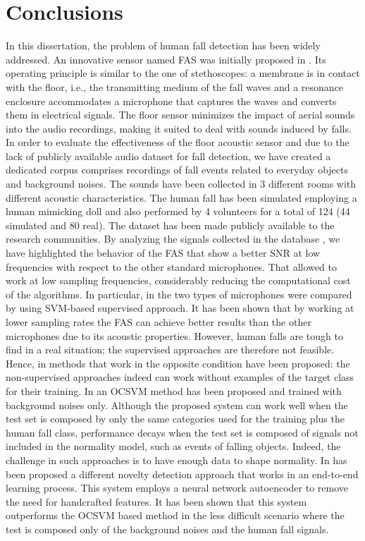  
\chapter{Conclusions}

In this dissertation, the problem of human fall detection has been widely addressed. An innovative sensor named FAS was initially proposed in . Its operating principle is similar to the one of stethoscopes: a membrane is in contact with the floor, i.e., the transmitting medium of the fall waves and a resonance enclosure accommodates a microphone that captures the waves and converts them in electrical signals. The floor sensor minimizes the impact of aerial sounds into the audio recordings, making it suited to deal with sounds induced by falls. In order to evaluate the effectiveness of the floor acoustic sensor and due to the lack of publicly available audio dataset for fall detection, we have created a dedicated corpus comprises recordings of fall events related to everyday objects and background noises. The sounds have been collected in 3 different rooms with different acoustic characteristics. The human fall has been simulated employing a human mimicking doll and also performed by 4 volunteers for a total of 124 (44 simulated and 80 real). The dataset has been made publicly available to the research communities. By analyzing the signals collected in the database , we have highlighted the behavior of the FAS that show a better SNR at low frequencies with respect to the other standard microphones. That allowed to work at low sampling frequencies, considerably reducing the computational cost of the algorithms. In particular, in  the two types of microphones were compared by using SVM-based supervised approach. It has been shown that by working at lower sampling rates the FAS can achieve better results than the other microphones due to its acoustic properties. However, human falls are tough to find in a real situation; the supervised approaches are therefore not feasible. Hence, in  methods that work in the opposite condition have been proposed: the non-supervised approaches indeed can work without examples of the target class for their training. In  an OCSVM method has been proposed and trained with background noises only. Although the proposed system can work well when the test set is composed by only the same categories used for the training plus the human fall class, performance decays when the test set is composed of signals not included in the normality model, such as events of falling objects. Indeed, the challenge in such approaches is to have enough data to shape normality. In  has been proposed a different novelty detection approach that works in an end-to-end learning process. This system employs a neural network autoencoder to remove the need for handcrafted features. It has been shown that this system outperforms the OCSVM based method in the less difficult scenario where the test is composed only of the background noises and the human fall signals. 
